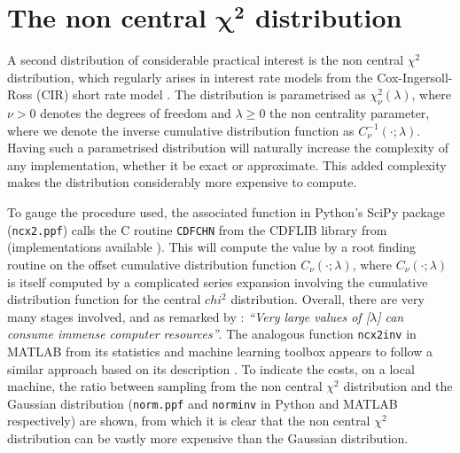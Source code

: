 \documentclass[manuscript,review]{acmart}
\begin{document}
\section{The non central \texorpdfstring{$ \bm{\chi^2} $}{chi-squared} distribution}
\label{sec:the_non_central_chi_squared_distribution}

A second distribution of considerable practical interest is the non central $ \chi^2 $ distribution, which regularly arises in interest rate models from the Cox-Ingersoll-Ross (CIR) short rate model \citep{cox1985theory}. The distribution is parametrised as $ \chi^2_\nu(\lambda) $, where $ \nu > 0 $ denotes the degrees of freedom and $ \lambda \geq 0 $ the non centrality parameter, where we denote the inverse cumulative distribution function as $ C^{-1}_\nu(\cdot; \lambda) $. Having such a parametrised distribution will naturally increase the complexity of any implementation, whether it be exact or approximate. This added complexity makes the distribution considerably more expensive to compute. 

To gauge the procedure used, the associated function in Python's SciPy package (\texttt{ncx2.ppf}) calls the C routine \texttt{CDFCHN} from the CDFLIB library from \citet{brown1994dcdflib} (implementations available \citep{burkardt2020cdflib}). This will compute the value by a root finding routine \citep[algorithm~R]{bus1975two} on the offset cumulative distribution function $ C_\nu(\cdot;\lambda) $, where $ C_\nu(\cdot;\lambda) $ is itself computed by a complicated series expansion \citep[(26.4.25)]{abramowitz1948handbook} involving the cumulative distribution function for the central $ chi^2 $ distribution. Overall, there are very many stages involved, and as remarked by \citet[\texttt{cdflib.c}]{burkardt2020cdflib}: \textit{``Very large values of
[$ \lambda $] can consume immense computer resources''}. The analogous function \texttt{ncx2inv} in MATLAB from its statistics and machine learning toolbox appears to follow a similar approach based on its description \citep[page~4301]{matlab2018statistics}. To indicate the costs, on a local machine, the ratio between sampling from the non central $ \chi^2 $ distribution and the Gaussian distribution (\texttt{norm.ppf} and \texttt{norminv} in Python and MATLAB respectively) are shown, from which it is clear that the non central $ \chi^2 $ distribution can be vastly more expensive than the Gaussian distribution. 
\end{document}
